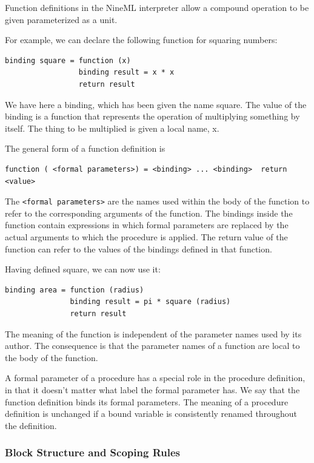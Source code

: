 \documentclass[a4paper]{article}
\begin{document}
Function definitions in the NineML interpreter allow a compound operation to be given
parameterized as a unit.

For example, we can declare the following function for squaring
numbers:

\begin{lstlisting}[style=display]
binding square = function (x)
                 binding result = x * x
                 return result
\end{lstlisting}

We have here a binding, which has been given the name square. The
value of the binding is a function that represents the operation of
multiplying something by itself. The thing to be multiplied is given a
local name, x.

The general form of a function definition is

\begin{lstlisting}[style=display]
function ( <formal parameters>) = <binding> ... <binding>  return <value>
\end{lstlisting}
 
The \verb^<formal parameters>^ are the names used within the body of the
function to refer to the corresponding arguments of the function. The
bindings inside the function contain expressions in which formal
parameters are replaced by the actual arguments to which the procedure
is applied. The return value of the function can refer to the values
of the bindings defined in that function.

Having defined square, we can now use it:

\begin{lstlisting}[style=display]
binding area = function (radius)
               binding result = pi * square (radius)
               return result
\end{lstlisting}

The meaning of the function is independent of the parameter names
used by its author. The consequence is that the parameter names of a
function are local to the body of the function.

A formal parameter of a procedure has a special role in the
procedure definition, in that it doesn't matter what label the formal
parameter has. We say that the function definition binds its formal
parameters. The meaning of a procedure definition is unchanged if a
bound variable is consistently renamed throughout the definition.
  
\subsubsection{Block Structure and Scoping Rules}
\end{document}
